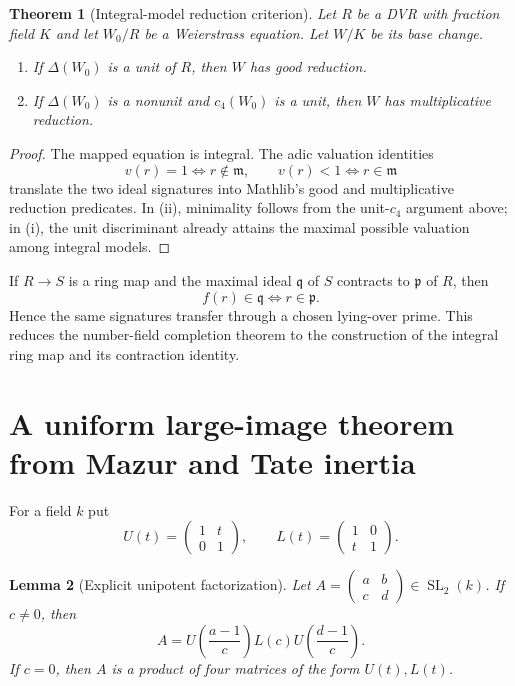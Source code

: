 \documentclass[11pt]{article}
\newtheorem{theorem}{Theorem}[section]
\newtheorem{lemma}[theorem]{Lemma}
\newcommand{\SL}{\operatorname{SL}}
\begin{document}
\begin{theorem}[Integral-model reduction criterion]
Let $R$ be a DVR with fraction field $K$ and let $W_0/R$ be a Weierstrass
equation.  Let $W/K$ be its base change.
\begin{enumerate}[label=(\roman*)]
\item If $\Delta(W_0)$ is a unit of $R$, then $W$ has good reduction.
\item If $\Delta(W_0)$ is a nonunit and $c_4(W_0)$ is a unit, then $W$ has
multiplicative reduction.
\end{enumerate}
\end{theorem}

\begin{proof}
The mapped equation is integral.  The adic valuation identities
\[
 v(r)=1\iff r\notin\mathfrak m,
 \qquad v(r)<1\iff r\in\mathfrak m
\]
translate the two ideal signatures into Mathlib's good and multiplicative
reduction predicates.  In (ii), minimality follows from the unit-$c_4$
argument above; in (i), the unit discriminant already attains the maximal
possible valuation among integral models.
\end{proof}

If $R\to S$ is a ring map and the maximal ideal $\mathfrak q$ of $S$
contracts to $\mathfrak p$ of $R$, then
\[
 f(r)\in\mathfrak q\iff r\in\mathfrak p.
\]
Hence the same signatures transfer through a chosen lying-over prime.  This
reduces the number-field completion theorem to the construction of the
integral ring map and its contraction identity.

\section{A uniform large-image theorem from Mazur and Tate inertia}

For a field $k$ put
\[
 U(t)=\begin{pmatrix}1&t\\0&1\end{pmatrix},
 \qquad
 L(t)=\begin{pmatrix}1&0\\t&1\end{pmatrix}.
\]

\begin{lemma}[Explicit unipotent factorization]
Let $A=\left(\begin{smallmatrix}a&b\\c&d\end{smallmatrix}\right)\in
\SL_2(k)$.
If $c\ne0$, then
\[
 A=U\!\left(\frac{a-1}{c}\right)L(c)
   U\!\left(\frac{d-1}{c}\right).
\]
If $c=0$, then $A$ is a product of four matrices of the form $U(t),L(t)$.
\end{lemma}
\end{document}
